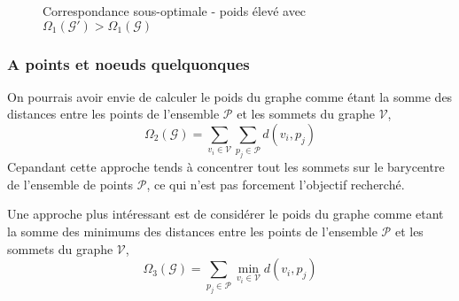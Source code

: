 \documentclass[12pt,a4paper]{article}
\begin{document}
\begin{figure}[H]
\centering
{}
\caption{Correspondance sous-optimale - poids élevé avec $\Omega_1(\mathcal{G}') > \Omega_1(\mathcal{G})$}
\end{figure}



\subsubsection{A points et noeuds quelquonques}



On pourrais avoir envie de calculer le poids du graphe comme étant la somme des distances entre les points de l'ensemble \( \mathcal{P} \) et les sommets du graphe \( \mathcal{V} \),
\begin{equation*}
    \Omega_2(\mathcal{G}) = \sum_{v_i \in \mathcal{V}} \sum_{p_j \in \mathcal{P}} d(v_i, p_j)
\end{equation*}
Cepandant cette approche tends à concentrer tout les sommets sur le barycentre de l'ensemble de points \( \mathcal{P} \),
ce qui n'est pas forcement l'objectif recherché. 


Une approche plus intéressant est de considérer le poids du graphe comme etant
la somme des minimums des distances entre les points de l'ensemble \( \mathcal{P} \) et les sommets du graphe \( \mathcal{V} \),
\begin{equation*}
    \Omega_3(\mathcal{G}) = \sum_{p_j \in \mathcal{P}} \min_{v_i \in \mathcal{V}} d(v_i, p_j)
\end{equation*}
\end{document}
